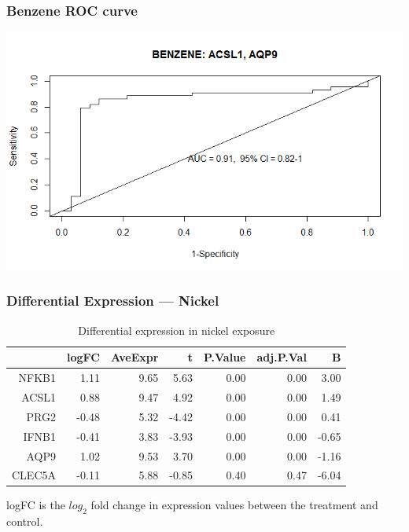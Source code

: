 \documentclass{beamer}
\begin{document}
\begin{frame}
	 \frametitle{Benzene ROC curve}
		\centering
	 	\includegraphics[scale=0.45]{../paper/figs/benzene1.png} 
\end{frame}

\begin{frame}[fragile]
  	\frametitle{Differential Expression --- Nickel}
 		\begin{table}[ht]
		\caption {Differential expression in nickel exposure} \label{tab:nickel} 
		\centering
		\begin{tabular}{rrrrrrr}
 			\hline
 			& logFC & AveExpr & t & P.Value & adj.P.Val & B \\ 
  			\hline
			NFKB1 & 1.11 & 9.65 & 5.63 & 0.00 & 0.00 & 3.00 \\ 
  			ACSL1 & 0.88 & 9.47 & 4.92 & 0.00 & 0.00 & 1.49 \\ 
  			PRG2 & -0.48 & 5.32 & -4.42 & 0.00 & 0.00 & 0.41 \\ 
  			IFNB1 & -0.41 & 3.83 & -3.93 & 0.00 & 0.00 & -0.65 \\ 
  			AQP9 & 1.02 & 9.53 & 3.70 & 0.00 & 0.00 & -1.16 \\ 
  			CLEC5A & -0.11 & 5.88 & -0.85 & 0.40 & 0.47 & -6.04 \\ 
  			 \hline
		\end{tabular}
		\end{table}
		\small logFC is the $log_{2}$ fold change in expression values between the treatment and control.
\end{frame}
\end{document}

